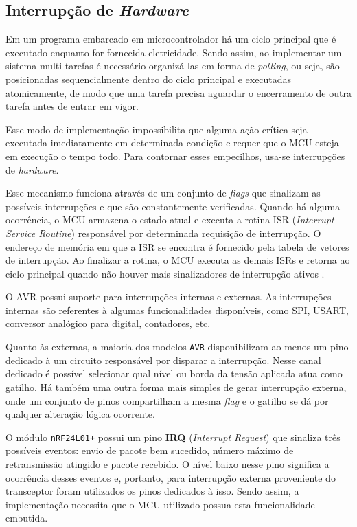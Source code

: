 \subsection{Interrupção de \textit{Hardware}}
Em um programa embarcado em microcontrolador há um ciclo principal que é executado enquanto for fornecida
eletricidade. Sendo assim, ao implementar um sistema multi-tarefas é necessário organizá-las em forma de
\textit{polling}, ou seja, são posicionadas sequencialmente dentro do ciclo principal e executadas
atomicamente, de modo que uma tarefa precisa aguardar o encerramento de outra tarefa antes de entrar em vigor.

Esse modo de implementação impossibilita que alguma ação crítica seja executada imediatamente em determinada
condição e requer que o MCU esteja em execução o tempo todo. Para contornar esses empecilhos, usa-se
interrupções de \textit{hardware}.

Esse mecanismo funciona através de um conjunto de \textit{flags} que sinalizam as possíveis interrupções e que
são constantemente verificadas. Quando há alguma ocorrência, o MCU armazena o estado atual e executa a rotina
ISR (\textit{Interrupt Service Routine}) responsável por determinada requisição de interrupção. O endereço de
memória em que a ISR se encontra é fornecido pela tabela de vetores de interrupção. Ao finalizar a rotina, o
MCU executa as demais ISRs e retorna ao ciclo principal quando não houver mais sinalizadores de interrupção
ativos \cite{williams2014}.

O AVR possui suporte para interrupções internas e externas. As interrupções internas são referentes à algumas
funcionalidades disponíveis, como SPI, USART, conversor analógico para digital, contadores, etc.

Quanto às externas, a maioria dos modelos \texttt{AVR} disponibilizam ao menos um pino dedicado à um circuito
responsável por disparar a interrupção. Nesse canal dedicado é possível selecionar qual nível ou borda da tensão
aplicada atua como gatilho. Há também uma outra forma mais simples de gerar interrupção externa, onde um
conjunto de pinos compartilham a mesma \textit{flag} e o gatilho se dá por qualquer alteração lógica
ocorrente.

O módulo \texttt{nRF24L01+} possui um pino \textbf{IRQ} (\textit{Interrupt Request}) que sinaliza três possíveis
eventos: envio de pacote bem sucedido, número máximo de retransmissão atingido e pacote recebido. O nível
baixo nesse pino significa a ocorrência desses eventos e, portanto, para interrupção externa proveniente do
transceptor foram utilizados os pinos dedicados à isso. Sendo assim, a implementação necessita que o MCU
utilizado possua esta funcionalidade embutida.


